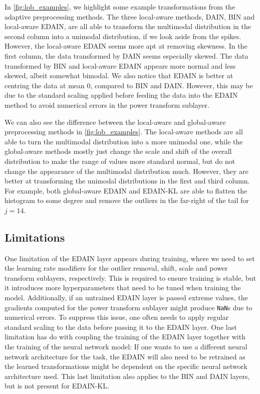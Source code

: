 \documentclass{statsmsc}
\begin{document}
{In \cref{fig:lob_examples}, we highlight some example transformations from the adaptive
preprocessing methods.
The three local-aware methods, \ac{DAIN}, \ac{BIN} and local-aware \ac{EDAIN}, are all able
to transform
the multimodal distribution in the second column into a unimodal distribution, if we look aside
from the spikes. However, the local-aware \ac{EDAIN} seems more apt at removing skewness.
In the first column, the data transformed by \ac{DAIN} seems especially skewed.
The data transformed by \ac{BIN} and local-aware \ac{EDAIN} appears more normal and less skewed,
albeit somewhat bimodal.
We also notice that \ac{EDAIN} is better at centring the data at mean 0, compared to \ac{BIN}
and \ac{DAIN}. However, this may be due to the standard scaling applied before feeding the data
into the \ac{EDAIN} method to avoid numerical errors in the power transform sublayer.

We can also see the difference between  the local-aware and global-aware preprocessing methods in
\cref{fig:lob_examples}.
The local-aware methods are all able to turn the multimodal distribution into a more unimodal
one, while the global-aware methods mostly just change the scale and shift of the overall
distribution to make the range of values more standard normal, but do not change the appearance of the
multimodal distribution much. However, they are better at transforming the unimodal distributions
in the first and third column. For example, both global-aware \ac{EDAIN} and \ac{EDAIN-KL}
are able to flatten the histogram to some degree and remove the outliers in the far-right of the
tail for $j=14$.


\subsection{Limitations}%
\label{sub:Limitations}

One limitation of the \ac{EDAIN} layer appears during training, where we need to set the
learning rate modifiers for the outlier removal, shift, scale and power transform sublayers,
respectively. This is required to ensure training is stable, but it introduces more hyperparameters
that need to be tuned when training the model.
Additionally, if an untrained \ac{EDAIN} layer is passed extreme values, the gradients computed
for the power transform sublayer might produce \texttt{NaN}s due to numerical errors. To suppress
this issue, one often needs to apply regular standard scaling to the data before passing it to
the \ac{EDAIN} layer. One last limitation has do with coupling the training of the \ac{EDAIN}
layer together with the training of the neural network model: If one wants to use a different
neural network architecture for the task, the \ac{EDAIN} will also need to be retrained as the
learned transformations might be dependent on the specific neural network architecture used.
This last limitation also applies to the \ac{BIN} and \ac{DAIN} layers, but is not present for
\ac{EDAIN-KL}.

}
\end{document}
